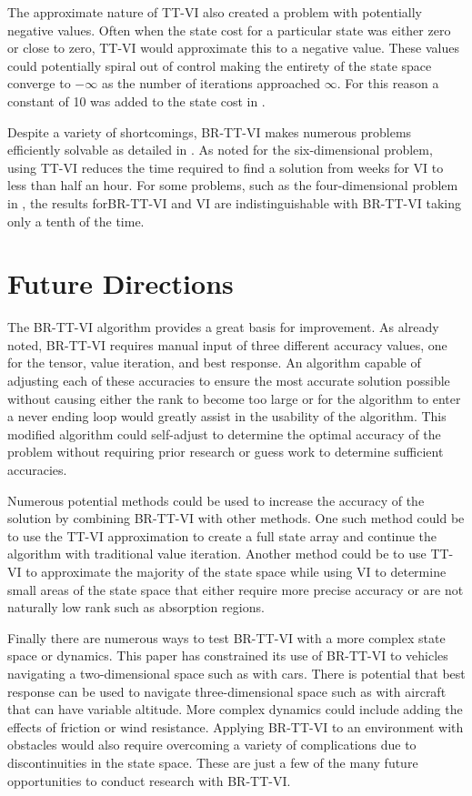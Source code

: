 The approximate nature of TT-VI also created a problem with potentially negative values. Often when the state cost for a particular state was either zero or close to zero, TT-VI would approximate this to a negative value. These values could potentially spiral out of control making the entirety of the state space converge to $-\infty$ as the number of iterations approached $\infty$. For this reason a constant of 10 was added to the state cost in .

Despite a variety of shortcomings, BR-TT-VI makes numerous problems efficiently solvable as detailed in . As noted for the six-dimensional problem, using TT-VI reduces the time required to find a solution from weeks for VI to less than half an hour. For some problems, such as the four-dimensional problem in , the results forBR-TT-VI and VI are indistinguishable with BR-TT-VI taking only a tenth of the time.           

\section{Future Directions}
The BR-TT-VI algorithm provides a great basis for improvement. As already noted, BR-TT-VI requires manual input of three different accuracy values, one for the tensor, value iteration, and best response. An algorithm capable of adjusting each of these accuracies to ensure the most accurate solution possible without causing either the rank to become too large or for the algorithm to enter a never ending loop would greatly assist in the usability of the algorithm. This modified algorithm could self-adjust to determine the optimal accuracy of the problem without requiring prior research or guess work to determine sufficient accuracies.

Numerous potential methods could be used to increase the accuracy of the solution by combining BR-TT-VI with other methods. One such method could be to use the TT-VI approximation to create a full state array and continue the algorithm with traditional value iteration. Another method could be to use TT-VI to approximate the majority of the state space while using VI to determine small areas of the state space that either require more precise accuracy or are not naturally low rank such as absorption regions.

Finally there are numerous ways to test BR-TT-VI with a more complex state space or dynamics. This paper has constrained its use of BR-TT-VI to vehicles navigating a two-dimensional space such as with cars. There is potential that best response can be used to navigate three-dimensional space such as with aircraft that can have variable altitude. More complex dynamics could include adding the effects of friction or wind resistance. Applying BR-TT-VI to an environment with obstacles would also require overcoming a variety of complications due to discontinuities in the state space. These are just a few of the many future opportunities to conduct research with BR-TT-VI.    


